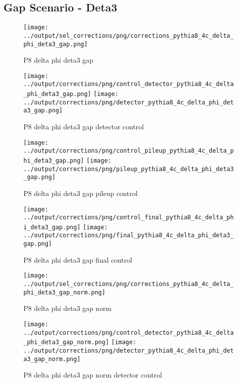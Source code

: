 \documentclass[11pt]{book}
\begin{document}
\clearpage
\subsection{Gap Scenario - Deta3}
\begin{figure}[ht]
\centering
\texttt{[image: ../output/sel\_corrections/png/corrections\_pythia8\_4c\_delta\_phi\_deta3\_gap.png]}
\caption{P8 delta phi deta3 gap}
\label{fig:p8_delta_phi_deta3_gap}
\end{figure}

\begin{figure}[ht]
\centering
\texttt{[image: ../output/corrections/png/control\_detector\_pythia8\_4c\_delta\_phi\_deta3\_gap.png]}
\texttt{[image: ../output/corrections/png/detector\_pythia8\_4c\_delta\_phi\_deta3\_gap.png]}
\caption{P8 delta phi deta3 gap detector control}
\label{fig:p8_delta_phi_deta3_gap_detector_control}
\end{figure}

\begin{figure}[ht]
\centering
\texttt{[image: ../output/corrections/png/control\_pileup\_pythia8\_4c\_delta\_phi\_deta3\_gap.png]}
\texttt{[image: ../output/corrections/png/pileup\_pythia8\_4c\_delta\_phi\_deta3\_gap.png]}
\caption{P8 delta phi deta3 gap pileup control}
\label{fig:p8_delta_phi_deta3_gap_pileup_control}
\end{figure}


\begin{figure}[ht]
\centering
\texttt{[image: ../output/corrections/png/control\_final\_pythia8\_4c\_delta\_phi\_deta3\_gap.png]}
\texttt{[image: ../output/corrections/png/final\_pythia8\_4c\_delta\_phi\_deta3\_gap.png]}
\caption{P8 delta phi deta3 gap final control}
\label{fig:p8_delta_phi_deta3_gap_final_control}
\end{figure}


\begin{figure}[ht]
\centering
\texttt{[image: ../output/sel\_corrections/png/corrections\_pythia8\_4c\_delta\_phi\_deta3\_gap\_norm.png]}
\caption{P8 delta phi deta3 gap norm}
\label{fig:p8_delta_phi_deta3_gap_norm}
\end{figure}

\begin{figure}[ht]
\centering
\texttt{[image: ../output/corrections/png/control\_detector\_pythia8\_4c\_delta\_phi\_deta3\_gap\_norm.png]}
\texttt{[image: ../output/corrections/png/detector\_pythia8\_4c\_delta\_phi\_deta3\_gap\_norm.png]}
\caption{P8 delta phi deta3 gap norm detector control}
\label{fig:p8_delta_phi_deta3_gap_norm_detector_control}
\end{figure}
\end{document}
